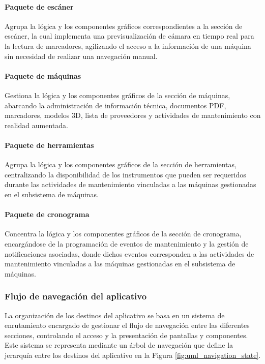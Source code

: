             \paragraph{Paquete de escáner}

                Agrupa la lógica y los componentes gráficos correspondientes a la sección de escáner, la cual implementa una previsualización de cámara en tiempo real para la lectura de marcadores, agilizando el acceso a la información de una máquina sin necesidad de realizar una navegación manual.

            \paragraph{Paquete de máquinas}

                Gestiona la lógica y los componentes gráficos de la sección de máquinas, abarcando la administración de información técnica, documentos PDF, marcadores, modelos 3D, lista de proveedores y actividades de mantenimiento con realidad aumentada.

            \paragraph{Paquete de herramientas}

                Agrupa la lógica y los componentes gráficos de la sección de herramientas, centralizando la disponibilidad de los instrumentos que pueden ser requeridos durante las actividades de mantenimiento vinculadas a las máquinas gestionadas en el subsistema de máquinas.

            \paragraph{Paquete de cronograma}

                Concentra la lógica y los componentes gráficos de la sección de cronograma, encargándose de la programación de eventos de mantenimiento y la gestión de notificaciones asociadas, donde dichos eventos corresponden a las actividades de mantenimiento vinculadas a las máquinas gestionadas en el subsistema de máquinas.

        \subsubsection{Flujo de navegación del aplicativo}

            La organización de los destinos del aplicativo se basa en un sistema de enrutamiento encargado de gestionar el flujo de navegación entre las diferentes secciones, controlando el acceso y la presentación de pantallas y componentes. Este sistema se representa mediante un árbol de navegación que define la jerarquía entre los destinos del aplicativo en la Figura \ref{fig:uml_navigation_state}.

